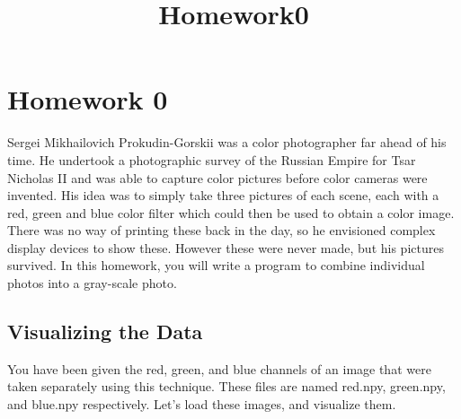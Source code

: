 \documentclass[11pt]{article}
\title{Homework0}
\begin{document}
    
    
    \maketitle
    
    

    
    \section{Homework 0}\label{homework-0}

Sergei Mikhailovich Prokudin-Gorskii was a color photographer far ahead
of his time. He undertook a photographic survey of the Russian Empire
for Tsar Nicholas II and was able to capture color pictures before color
cameras were invented. His idea was to simply take three pictures of
each scene, each with a red, green and blue color filter which could
then be used to obtain a color image. There was no way of printing these
back in the day, so he envisioned complex display devices to show these.
However these were never made, but his pictures survived. In this
homework, you will write a program to combine individual photos into a
gray-scale photo.

\subsection{Visualizing the Data}\label{visualizing-the-data}

You have been given the red, green, and blue channels of an image that
were taken separately using this technique. These files are named
red.npy, green.npy, and blue.npy respectively. Let's load these images,
and visualize them.
\end{document}
